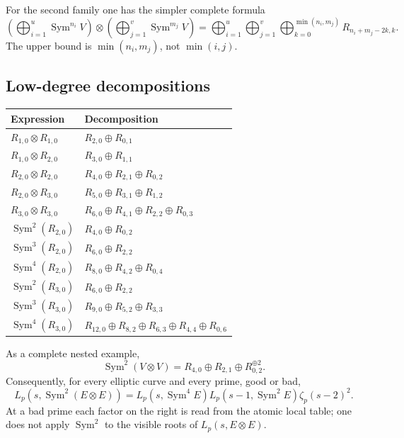 \documentclass[11pt,reqno]{amsart}
\theoremstyle{definition}
\theoremstyle{remark}
\newcommand{\Sym}{\operatorname{Sym}}
\begin{document}
For the second family one has the simpler complete formula
\begin{equation}\label{eq:second-original-family}
 \left(\bigoplus_{i=1}^{u}\Sym^{n_i}V\right)
 \otimes
 \left(\bigoplus_{j=1}^{v}\Sym^{m_j}V\right)
 =
 \bigoplus_{i=1}^{u}\bigoplus_{j=1}^{v}
 \bigoplus_{k=0}^{\min(n_i,m_j)}
 R_{n_i+m_j-2k,k}.
\end{equation}
The upper bound is $\min(n_i,m_j)$, not $\min(i,j)$.

\subsection{Low-degree decompositions}

\begin{center}
\renewcommand{\arraystretch}{1.15}
\begin{tabular}{@{}ll@{}}
\toprule
Expression & Decomposition \\
\midrule
$R_{1,0}\otimes R_{1,0}$ & $R_{2,0}\oplus R_{0,1}$ \\
$R_{1,0}\otimes R_{2,0}$ & $R_{3,0}\oplus R_{1,1}$ \\
$R_{2,0}\otimes R_{2,0}$ & $R_{4,0}\oplus R_{2,1}\oplus R_{0,2}$ \\
$R_{2,0}\otimes R_{3,0}$ & $R_{5,0}\oplus R_{3,1}\oplus R_{1,2}$ \\
$R_{3,0}\otimes R_{3,0}$ &
$R_{6,0}\oplus R_{4,1}\oplus R_{2,2}\oplus R_{0,3}$ \\
$\Sym^2(R_{2,0})$ & $R_{4,0}\oplus R_{0,2}$ \\
$\Sym^3(R_{2,0})$ & $R_{6,0}\oplus R_{2,2}$ \\
$\Sym^4(R_{2,0})$ & $R_{8,0}\oplus R_{4,2}\oplus R_{0,4}$ \\
$\Sym^2(R_{3,0})$ & $R_{6,0}\oplus R_{2,2}$ \\
$\Sym^3(R_{3,0})$ & $R_{9,0}\oplus R_{5,2}\oplus R_{3,3}$ \\
$\Sym^4(R_{3,0})$ &
$R_{12,0}\oplus R_{8,2}\oplus R_{6,3}\oplus R_{4,4}\oplus R_{0,6}$ \\
\bottomrule
\end{tabular}
\end{center}

As a complete nested example,
\begin{equation}\label{eq:nested-running-example}
 \Sym^2(V\otimes V)
 =R_{4,0}\oplus R_{2,1}\oplus R_{0,2}^{\oplus2}.
\end{equation}
Consequently, for every elliptic curve and every prime, good or bad,
\begin{equation}\label{eq:nested-running-L}
 L_p(s,\Sym^2(E\otimes E))
 =L_p(s,\Sym^4E)L_p(s-1,\Sym^2E)\zeta_p(s-2)^2.
\end{equation}
At a bad prime each factor on the right is read from the atomic local table;
one does not apply $\Sym^2$ to the visible roots of $L_p(s,E\otimes E)$.
\end{document}
